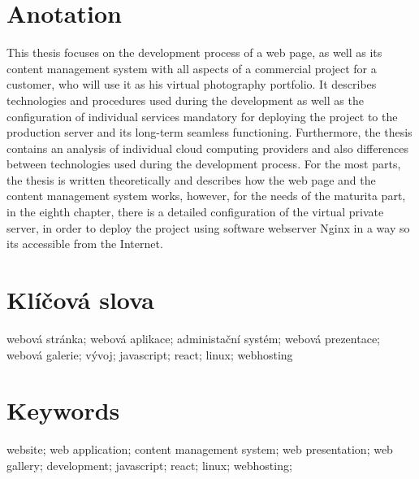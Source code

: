 \documentclass[12pt,a4paper]{report}
\begin{document}
  \section*{Anotation}
  This thesis focuses on the development process of a web page, as well as its content management system with all aspects of a commercial project
  for a customer, who will use it as his virtual photography portfolio. It describes technologies and procedures used during the development 
  as well as the configuration of individual services mandatory for deploying the project to the production server and its long-term seamless functioning. Furthermore, the thesis contains 
  an analysis of individual cloud computing providers and also differences between technologies used during the development process. For the most parts, the thesis is written theoretically 
  and describes how the web page and the content management system works, however, for the needs of the maturita part, in the eighth chapter, there is a detailed configuration of the virtual private server, in order to deploy the project 
  using software webserver Nginx in a way so its accessible from the Internet.
  \section*{Klíčová slova}
  \noindent webová stránka; webová aplikace; administační systém; webová prezentace; webová galerie; vývoj; javascript; react; linux; webhosting
  
  \section*{Keywords}
  \noindent website; web application; content management system; web presentation; web gallery; development; javascript; react; linux; webhosting;  

  \clearpage
  
  \tableofcontents
 
  \clearpage
\end{document}
